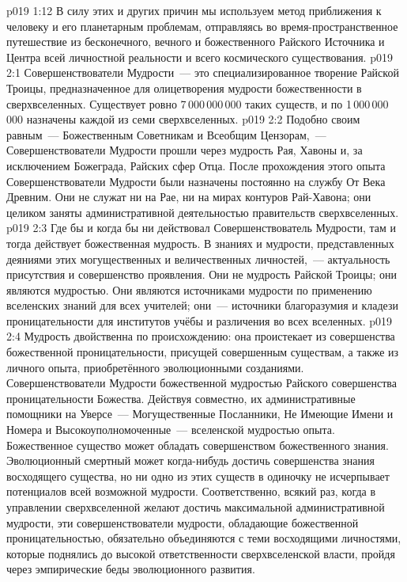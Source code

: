 \vs p019 1:12 \pc В силу этих и других причин мы используем метод приближения к человеку и его планетарным проблемам, отправляясь во время\hyp{}пространственное путешествие из бесконечного, вечного и божественного Райского Источника и Центра всей личностной реальности и всего космического существования.
\vs p019 2:1 Совершенствователи Мудрости~--- это специализированное творение Райской Троицы, предназначенное для олицетворения мудрости божественности в сверхвселенных. Существует ровно 7\,000\,000\,000 таких существ, и по 1\,000\,000\,000 назначены каждой из семи сверхвселенных.
\vs p019 2:2 Подобно своим равным~--- Божественным Советникам и Всеобщим Цензорам,~--- Совершенствователи Мудрости прошли через мудрость Рая, Хавоны и, за исключением Божеграда, Райских сфер Отца. После прохождения этого опыта Совершенствователи Мудрости были назначены постоянно на службу От Века Древним. Они не служат ни на Рае, ни на мирах контуров Рай\hyp{}Хавона; они целиком заняты административной деятельностью правительств сверхвселенных.
\vs p019 2:3 \pc Где бы и когда бы ни действовал Совершенствователь Мудрости, там и тогда действует божественная мудрость. В знаниях и мудрости, представленных деяниями этих могущественных и величественных личностей,~--- актуальность присутствия и совершенство проявления. Они не  мудрость Райской Троицы; они являются  мудростью. Они являются источниками мудрости по применению вселенских знаний для всех учителей; они~--- источники благоразумия и кладези проницательности для институтов учёбы и различения во всех вселенных.
\vs p019 2:4 Мудрость двойственна по происхождению: она проистекает из совершенства божественной проницательности, присущей совершенным существам, а также из личного опыта, приобретённого эволюционными созданиями. Совершенствователи Мудрости  божественной мудростью Райского совершенства проницательности Божества. Действуя совместно, их административные помощники на Уверсе~--- Могущественные Посланники, Не Имеющие Имени и Номера и Высокоуполномоченные~---  вселенской мудростью опыта. Божественное существо может обладать совершенством божественного знания. Эволюционный смертный может когда\hyp{}нибудь достичь совершенства знания восходящего существа, но ни одно из этих существ в одиночку не исчерпывает потенциалов всей возможной мудрости. Соответственно, всякий раз, когда в управлении сверхвселенной желают достичь максимальной административной мудрости, эти совершенствователи мудрости, обладающие божественной проницательностью, обязательно объединяются с теми восходящими личностями, которые поднялись до высокой ответственности сверхвселенской власти, пройдя через эмпирические беды эволюционного развития.
